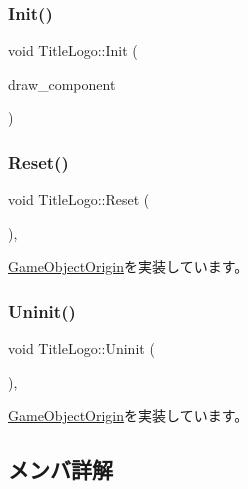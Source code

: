 \subsubsection{\texorpdfstring{Init()}{Init()}}
{\footnotesize\ttfamily void Title\+Logo\+::\+Init (\begin{DoxyParamCaption}\item[{\mbox{\hyperlink{class_draw_component}{Draw\+Component}} $\ast$}]{draw\+\_\+component }\end{DoxyParamCaption})}

\mbox{\label{class_title_logo_a8bca39d06592b95b26024c2d86ac349c}} 
\subsubsection{\texorpdfstring{Reset()}{Reset()}}
{\footnotesize\ttfamily void Title\+Logo\+::\+Reset (\begin{DoxyParamCaption}{ }\end{DoxyParamCaption})\hspace{0.3cm}{\ttfamily [override]}, {\ttfamily [virtual]}}



\mbox{\hyperlink{class_game_object_origin_af9af378a4fd9028316a6fdb461ed6a10}{Game\+Object\+Origin}}を実装しています。

\mbox{\label{class_title_logo_a177943b3becc80fcdb7a34f131b07ee9}} 
\subsubsection{\texorpdfstring{Uninit()}{Uninit()}}
{\footnotesize\ttfamily void Title\+Logo\+::\+Uninit (\begin{DoxyParamCaption}{ }\end{DoxyParamCaption})\hspace{0.3cm}{\ttfamily [override]}, {\ttfamily [virtual]}}



\mbox{\hyperlink{class_game_object_origin_aeac8fc4a1f625982313a9a60dd35d016}{Game\+Object\+Origin}}を実装しています。



\subsection{メンバ詳解}
\mbox{\label{class_title_logo_a842ef60ff79632e1dad76599952eb95a}} 
